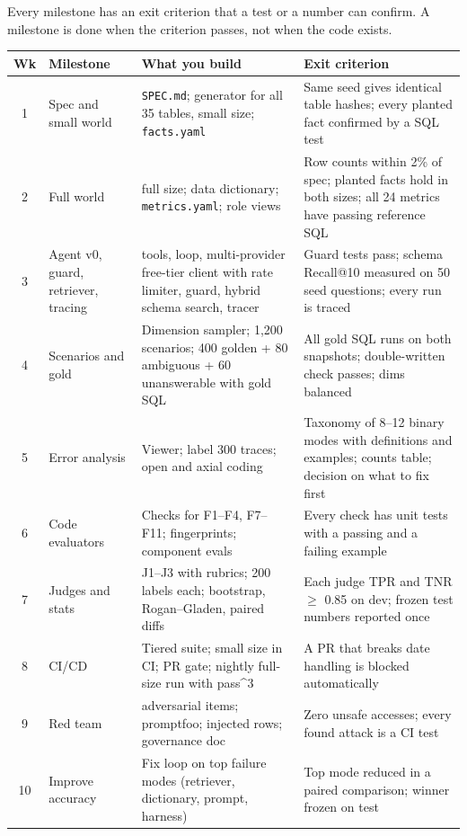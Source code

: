 \documentclass[11pt,a4paper]{article}
\newcommand{\code}[1]{\texttt{\small #1}}
\begin{document}
Every milestone has an exit criterion that a test or a number can confirm. A milestone is done
when the criterion passes, not when the code exists.

{\small
\begin{tabular}{@{}c >{\raggedright\arraybackslash}p{2.6cm} >{\raggedright\arraybackslash}p{5.6cm} >{\raggedright\arraybackslash}p{4.6cm}@{}}
\toprule
\textbf{Wk} & \textbf{Milestone} & \textbf{What you build} & \textbf{Exit criterion}\\
\midrule
1 & Spec and small world & \code{SPEC.md}; generator for all 35 tables, small size; \code{facts.yaml} & Same seed gives identical table hashes; every planted fact confirmed by a SQL test\\
2 & Full world & full size; data dictionary; \code{metrics.yaml}; role views & Row counts within 2\% of spec; planted facts hold in both sizes; all 24 metrics have passing reference SQL\\
3 & Agent v0, guard, retriever, tracing & 7 tools, loop, multi-provider free-tier client with rate limiter, guard, hybrid schema search, tracer & Guard tests pass; schema Recall@10 measured on 50 seed questions; every run is traced\\
4 & Scenarios and gold & Dimension sampler; 1{,}200 scenarios; 400 golden + 80 ambiguous + 60 unanswerable with gold SQL & All gold SQL runs on both snapshots; double-written check passes; dims balanced\\
5 & Error analysis & Viewer; label 300 traces; open and axial coding & Taxonomy of 8--12 binary modes with definitions and examples; counts table; decision on what to fix first\\
6 & Code evaluators & Checks for F1--F4, F7--F11; fingerprints; component evals & Every check has unit tests with a passing and a failing example\\
7 & Judges and stats & J1--J3 with rubrics; 200 labels each; bootstrap, Rogan--Gladen, paired diffs & Each judge TPR and TNR $\geq$ 0.85 on dev; frozen test numbers reported once\\
8 & CI/CD & Tiered suite; small size in CI; PR gate; nightly full-size run with pass\^{}3 & A PR that breaks date handling is blocked automatically\\
9 & Red team & 150 adversarial items; promptfoo; injected rows; governance doc & Zero unsafe accesses; every found attack is a CI test\\
10 & Improve accuracy & Fix loop on top failure modes (retriever, dictionary, prompt, harness) & Top mode reduced in a paired comparison; winner frozen on test\\

\end{tabular}}
\end{document}
